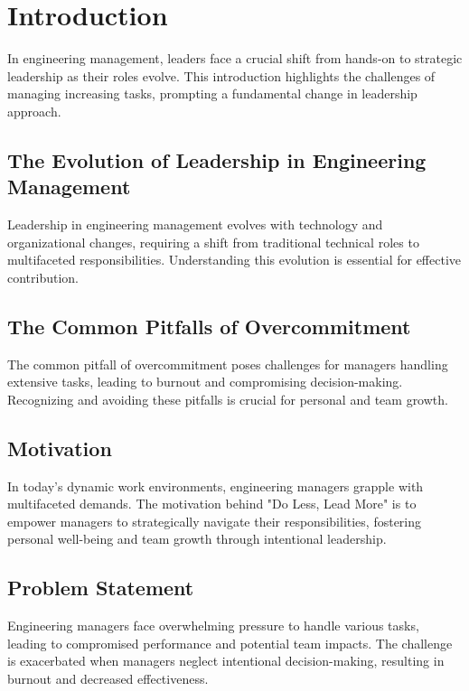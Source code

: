 \documentclass[10pt]{article}
\begin{document}
\newpage

\tableofcontents


\newpage


\section{Introduction}
In engineering management, leaders face a crucial shift from hands-on to strategic leadership as their roles evolve. This introduction highlights the challenges of managing increasing tasks, prompting a fundamental change in leadership approach.

\subsection{The Evolution of Leadership in Engineering Management}
Leadership in engineering management evolves with technology and organizational changes, requiring a shift from traditional technical roles to multifaceted responsibilities. Understanding this evolution is essential for effective contribution.

\subsection{The Common Pitfalls of Overcommitment}
The common pitfall of overcommitment poses challenges for managers handling extensive tasks, leading to burnout and compromising decision-making. Recognizing and avoiding these pitfalls is crucial for personal and team growth.

\subsection{Motivation}
In today's dynamic work environments, engineering managers grapple with multifaceted demands. The motivation behind "Do Less, Lead More" is to empower managers to strategically navigate their responsibilities, fostering personal well-being and team growth through intentional leadership.

\subsection{Problem Statement}
Engineering managers face overwhelming pressure to handle various tasks, leading to compromised performance and potential team impacts. The challenge is exacerbated when managers neglect intentional decision-making, resulting in burnout and decreased effectiveness.
\end{document}
